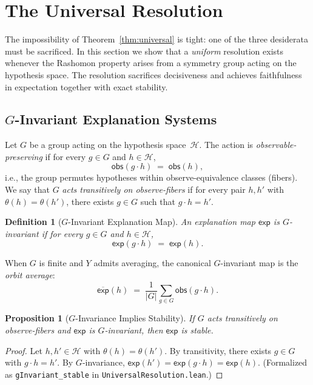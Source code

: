 \documentclass{article}
\newtheorem{definition}{Definition}
\newtheorem{proposition}{Proposition}
\newcommand{\sH}{\mathcal{H}}
\begin{document}
\section{The Universal Resolution}
\label{sec:resolution}

The impossibility of Theorem~\ref{thm:universal} is tight: one of the three
desiderata must be sacrificed.  In this section we show that a \emph{uniform}
resolution exists whenever the Rashomon property arises from a symmetry group
acting on the hypothesis space.  The resolution sacrifices decisiveness and
achieves faithfulness in expectation together with exact stability.



\subsection{$G$-Invariant Explanation Systems}
\label{sec:g-invariant}

Let $G$ be a group acting on the hypothesis space~$\sH$.  The action is
\emph{observable-preserving} if for every $g \in G$ and $h \in \sH$,
\[
  \mathsf{obs}(g \cdot h) \;=\; \mathsf{obs}(h),
\]
i.e., the group permutes hypotheses within observe-equivalence classes
(fibers).  We say that $G$ \emph{acts transitively on observe-fibers} if for
every pair $h, h'$ with $\theta(h) = \theta(h')$, there exists $g \in G$
such that $g \cdot h = h'$.

\begin{definition}[$G$-Invariant Explanation Map]
\label{def:g-invariant}
An explanation map $\mathsf{exp}$ is \emph{$G$-invariant} if for every
$g \in G$ and $h \in \sH$,
\[
  \mathsf{exp}(g \cdot h) \;=\; \mathsf{exp}(h).
\]
\end{definition}

When $G$ is finite and $Y$ admits averaging, the canonical $G$-invariant map
is the \emph{orbit average}:
\[
  \overline{\mathsf{exp}}(h) \;=\; \frac{1}{|G|}\sum_{g \in G} \mathsf{obs}(g \cdot h).
\]

\begin{proposition}[$G$-Invariance Implies Stability]
\label{prop:g-invariant-stable}
If $G$ acts transitively on observe-fibers and $\mathsf{exp}$ is
$G$-invariant, then $\mathsf{exp}$ is stable.
\end{proposition}

\begin{proof}
Let $h, h' \in \sH$ with $\theta(h) = \theta(h')$.  By transitivity, there
exists $g \in G$ with $g \cdot h = h'$.  By $G$-invariance,
$\mathsf{exp}(h') = \mathsf{exp}(g \cdot h) = \mathsf{exp}(h)$.
(Formalized as \texttt{gInvariant\_stable} in
\texttt{UniversalResolution.lean}.)
\end{proof}
\end{document}
